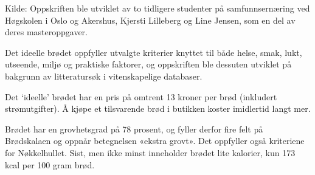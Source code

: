 Kilde: Oppskriften ble utviklet av to tidligere studenter på samfunnsernæring ved Høgskolen i Oslo og Akershus, Kjersti Lilleberg og Line Jensen, som en del av deres masteroppgaver.

Det ideelle brødet oppfyller utvalgte kriterier knyttet til både helse, smak, lukt, utseende, miljø og praktiske faktorer, og oppskriften ble dessuten utviklet på bakgrunn av litteratursøk i vitenskapelige databaser.

Det `ideelle' brødet har en pris på omtrent 13 kroner per brød (inkludert strømutgifter). Å kjøpe et tilsvarende brød i butikken koster imidlertid langt mer.

Brødet har en grovhetsgrad på 78 prosent, og fyller derfor fire felt på Brødskalaen og oppnår betegnelsen «ekstra grovt». Det oppfyller også kriteriene for Nøkkelhullet. Sist, men ikke minst inneholder brødet lite kalorier, kun 173 kcal per 100 gram brød.
